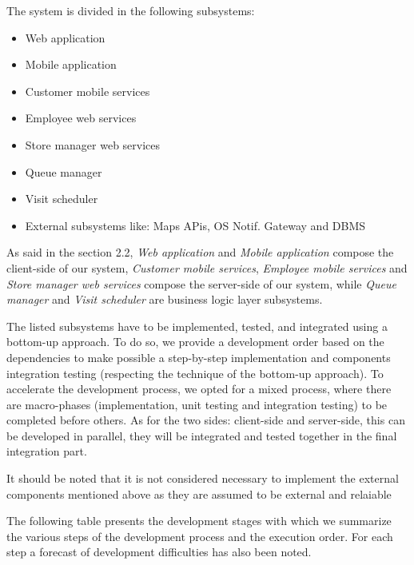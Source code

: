 The system is divided in the following subsystems:
\begin{itemize}
    \item Web application
    \item Mobile application
    \item Customer mobile services
    \item Employee web services
    \item Store manager web services
    \item Queue manager
    \item Visit scheduler
    \item External subsystems like: Maps APis, OS Notif. Gateway and DBMS
\end{itemize}
As said in the section 2.2, \textit{Web application} and \textit{Mobile application} compose the client-side of our system, \textit{Customer mobile services}, \textit{Employee mobile services} and \textit{Store manager web services} compose the server-side of our system, while \textit{Queue manager} and \textit{Visit scheduler} are business logic layer subsystems. 

The listed subsystems have to be implemented, tested, and integrated using a bottom-up approach. To do so, we provide a development order based on the dependencies to make possible a step-by-step implementation and components integration testing (respecting the technique of the bottom-up approach). To accelerate the development process, we opted for a mixed process, where there are macro-phases (implementation, unit testing and integration testing) to be completed before others. As for the two sides: client-side and server-side, this can be developed in parallel, they will be integrated and tested together in the final integration part.

It should be noted that it is not considered necessary to implement the external components mentioned above as they are assumed to be external and relaiable

The following table presents the development stages with which we summarize the various steps of the development process and the execution order. For each step a forecast of development difficulties has also been noted.

